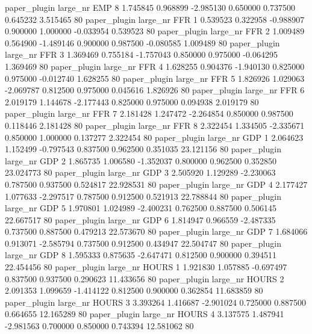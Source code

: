 paper_plugin   large_nr      EMP                 8  1.745845  0.968899  -2.985130 0.650000 0.737500  0.645232    3.515465 80
paper_plugin   large_nr      FFR                 1  0.539523  0.322958  -0.988907 0.900000 1.000000 -0.033954    0.539523 80
paper_plugin   large_nr      FFR                 2  1.009489  0.564900  -1.489146 0.900000 0.987500 -0.080585    1.009489 80
paper_plugin   large_nr      FFR                 3  1.369469  0.755184  -1.757043 0.850000 0.975000 -0.064295    1.369469 80
paper_plugin   large_nr      FFR                 4  1.628255  0.904376  -1.940130 0.825000 0.975000 -0.012740    1.628255 80
paper_plugin   large_nr      FFR                 5  1.826926  1.029063  -2.069787 0.812500 0.975000  0.045616    1.826926 80
paper_plugin   large_nr      FFR                 6  2.019179  1.144678  -2.177443 0.825000 0.975000  0.094938    2.019179 80
paper_plugin   large_nr      FFR                 7  2.181428  1.247472  -2.264854 0.850000 0.987500  0.118446    2.181428 80
paper_plugin   large_nr      FFR                 8  2.322454  1.334505  -2.335671 0.850000 1.000000  0.137277    2.322454 80
paper_plugin   large_nr      GDP                 1  2.064623  1.152499  -0.797543 0.837500 0.962500  0.351035   23.121156 80
paper_plugin   large_nr      GDP                 2  1.865735  1.006580  -1.352037 0.800000 0.962500  0.352850   23.024773 80
paper_plugin   large_nr      GDP                 3  2.505920  1.129289  -2.230063 0.787500 0.937500  0.524817   22.928531 80
paper_plugin   large_nr      GDP                 4  2.177427  1.077633  -2.297517 0.787500 0.912500  0.521913   22.788844 80
paper_plugin   large_nr      GDP                 5  1.970801  1.024989  -2.400231 0.762500 0.887500  0.506145   22.667517 80
paper_plugin   large_nr      GDP                 6  1.814947  0.966559  -2.487335 0.737500 0.887500  0.479213   22.573670 80
paper_plugin   large_nr      GDP                 7  1.684066  0.913071  -2.585794 0.737500 0.912500  0.434947   22.504747 80
paper_plugin   large_nr      GDP                 8  1.595333  0.875635  -2.647471 0.812500 0.900000  0.394511   22.454456 80
paper_plugin   large_nr    HOURS                 1  1.921830  1.057885  -0.697497 0.837500 0.937500  0.290623   11.433656 80
paper_plugin   large_nr    HOURS                 2  2.091353  1.099659  -1.414122 0.812500 0.900000  0.362854   11.683859 80
paper_plugin   large_nr    HOURS                 3  3.393264  1.416687  -2.901024 0.725000 0.887500  0.664655   12.165289 80
paper_plugin   large_nr    HOURS                 4  3.137575  1.487941  -2.981563 0.700000 0.850000  0.743394   12.581062 80
